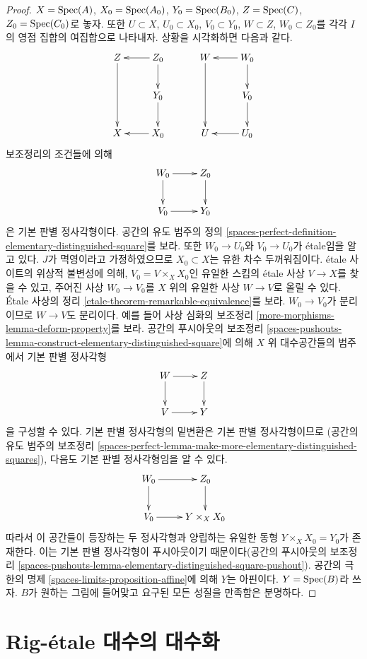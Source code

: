 \begin{proof}
$X = \mathop{\mathrm{Spec}}(A)$, $X_0 = \mathop{\mathrm{Spec}}(A_0)$, $Y_0 = \mathop{\mathrm{Spec}}(B_0)$,
$Z = \mathop{\mathrm{Spec}}(C)$, $Z_0 = \mathop{\mathrm{Spec}}(C_0)$로 놓자. 또한
$U \subset X$, $U_0 \subset X_0$, $V_0 \subset Y_0$,
$W \subset Z$, $W_0 \subset Z_0$를 각각 $I$의 영점 집합의 여집합으로
나타내자. 상황을 시각화하면 다음과 같다.
$$
\xymatrix{
Z \ar[dd] & Z_0 \ar[l] \ar[d] \\
& Y_0 \ar[d] \\
X & X_0 \ar[l]
}
\quad\quad\quad
\xymatrix{
W \ar[dd] & W_0 \ar[l] \ar[d] \\
& V_0 \ar[d] \\
U & U_0 \ar[l]
}
$$
보조정리의 조건들에 의해
$$
\xymatrix{
W_0 \ar[r] \ar[d] & Z_0 \ar[d] \\
V_0 \ar[r] & Y_0
}
$$
은 기본 판별 정사각형이다. 공간의 유도 범주의 정의
\ref{spaces-perfect-definition-elementary-distinguished-square}를 보라.
또한 $W_0 \to U_0$와 $V_0 \to U_0$가 \'etale임을 알고 있다.
$J$가 멱영이라고 가정하였으므로 $X_0 \subset X$는 유한 차수 두꺼워짐이다.
\'etale 사이트의 위상적 불변성에 의해, $V_0 = V \times_X X_0$인
유일한 스킴의 \'etale 사상 $V \to X$를 찾을 수 있고,
주어진 사상 $W_0 \to V_0$를 $X$ 위의 유일한 사상 $W \to V$로 올릴 수 있다.
\'Etale 사상의 정리 \ref{etale-theorem-remarkable-equivalence}를 보라.
$W_0 \to V_0$가 분리이므로 $W \to V$도 분리이다.
예를 들어 사상 심화의 보조정리 \ref{more-morphisms-lemma-deform-property}를 보라.
공간의 푸시아웃의 보조정리
\ref{spaces-pushouts-lemma-construct-elementary-distinguished-square}에 의해
$X$ 위 대수공간들의 범주에서 기본 판별 정사각형
$$
\xymatrix{
W \ar[r] \ar[d] & Z \ar[d] \\
V \ar[r] & Y
}
$$
을 구성할 수 있다. 기본 판별 정사각형의 밑변환은 기본 판별 정사각형이므로
(공간의 유도 범주의 보조정리
\ref{spaces-perfect-lemma-make-more-elementary-distinguished-squares}),
다음도 기본 판별 정사각형임을 알 수 있다.
$$
\xymatrix{
W_0 \ar[r] \ar[d] & Z_0 \ar[d] \\
V_0 \ar[r] & Y \times_X X_0
}
$$
따라서 이 공간들이 등장하는 두 정사각형과 양립하는 유일한 동형
$Y \times_X X_0 = Y_0$가 존재한다. 이는 기본 판별 정사각형이
푸시아웃이기 때문이다(공간의 푸시아웃의 보조정리
\ref{spaces-pushouts-lemma-elementary-distinguished-square-pushout}).
공간의 극한의 명제 \ref{spaces-limits-proposition-affine}에 의해
$Y$는 아핀이다. $Y = \mathop{\mathrm{Spec}}(B)$라 쓰자. $B$가 원하는 그림에 들어맞고
요구된 모든 성질을 만족함은 분명하다.
\end{proof}


\section{Rig-\'etale 대수의 대수화}
\label{section-approximation-principal}


